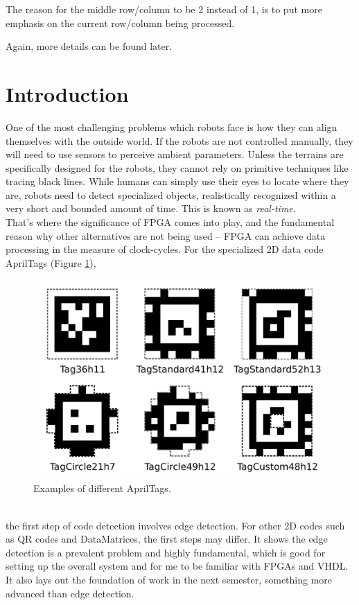 \documentclass{article}
\begin{document}
	The reason for the middle row/column to be 2 instead of 1, is to put more emphasis on the current row/column being processed.
	
	Again, more details can be found later.
		
	\newpage\section{Introduction}
	One of the most challenging problems which robots face is how they can align themselves with the outside world. If the robots are not controlled manually, they will need to use sensors to perceive ambient parameters. Unless the terrains are specifically designed for the robots, they cannot rely on primitive techniques like tracing black lines. While humans can simply use their eyes to locate where they are, robots need to detect specialized objects, realistically recognized within a very short and bounded amount of time. This is known as \emph{real-time}.
	\\
	
	That's where the significance of FPGA comes into play, and the fundamental reason why other alternatives are not being used -- FPGA can achieve data processing in the measure of clock-cycles. For the specialized 2D data code AprilTags (Figure \ref{fig:apriltag}),
	\begin{figure}[h]
		\centering
		\includegraphics[scale=0.2]{apriltag}
		\caption{Examples of different AprilTags.}
		\label{fig:apriltag}
	\end{figure}
	\\
	
	the first step of code detection involves edge detection. For other 2D codes such as QR codes and DataMatrices, the first steps may differ. It shows the edge detection is a prevalent problem and highly fundamental, which is good for setting up the overall system and for me to be familiar with FPGAs and VHDL. It also lays out the foundation of work in the next semester, something more advanced than edge detection.
\end{document}
